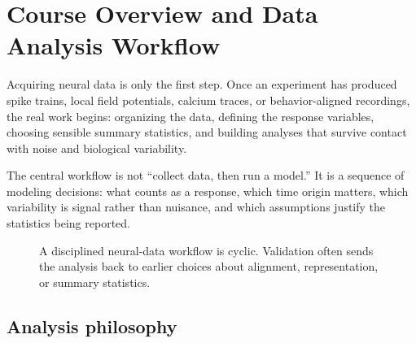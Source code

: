 \chapter{Course Overview and Data Analysis Workflow}

Acquiring neural data is only the first step. Once an experiment has produced spike trains, local field potentials, calcium traces, or behavior-aligned recordings, the real work begins: organizing the data, defining the response variables, choosing sensible summary statistics, and building analyses that survive contact with noise and biological variability.

The central workflow is not ``collect data, then run a model.'' It is a sequence of modeling decisions: what counts as a response, which time origin matters, which variability is signal rather than nuisance, and which assumptions justify the statistics being reported.

\begin{figure}[h]
\centering
{}
\caption{A disciplined neural-data workflow is cyclic. Validation often sends the analysis back to earlier choices about alignment, representation, or summary statistics.}
\end{figure}

\section{Analysis philosophy}


